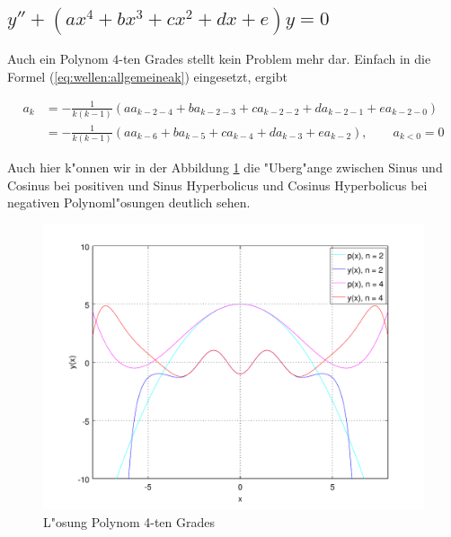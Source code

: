 \subsection{\texorpdfstring{$y''+(ax^4+bx^3+cx^2+dx+e)y = 
0$}{y''-(ax4+bx3+cx2+dx+e)y = 0}}

Auch ein Polynom $4$-ten Grades stellt kein Problem mehr dar. Einfach in die 
Formel (\ref{eq:wellen:allgemeineak}) eingesetzt, ergibt

\begin{equation*}
	\begin{split}
		a_k &= -\frac{1}{k(k-1)} (aa_{k-2-4} + 
		ba_{k-2-3} + ca_{k-2-2} + da_{k-2-1} +ea_{k-2-0})
		\\
		&= -\frac{1}{k(k-1)} (aa_{k-6} + ba_{k-5} + 
		ca_{k-4} + da_{k-3} +ea_{k-2}), \qquad a_{k<0} = 0
	\end{split}
\end{equation*}

Auch hier k"onnen wir in der Abbildung \ref{fig:wellen:poly4-dgl} die 
"Uberg"ange zwischen Sinus und Cosinus bei positiven und Sinus Hyperbolicus und 
Cosinus Hyperbolicus bei negativen Polynoml"osungen deutlich sehen.

\begin{figure}
	\includegraphics[scale=0.65]{./wellen/images/allgemein/n4.pdf}
	\caption{L"osung Polynom 4-ten Grades}
	\label{fig:wellen:poly4-dgl}
\end{figure}